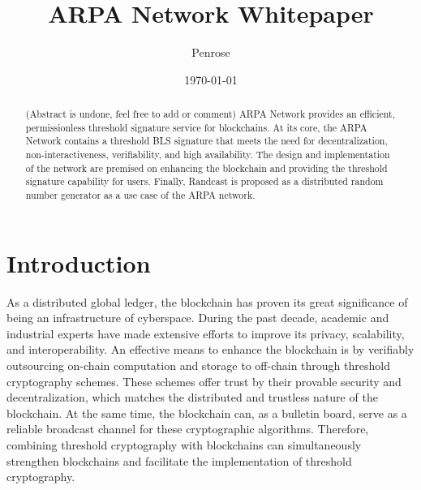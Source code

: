 \documentclass[11pt]{article}
\title{ARPA Network Whitepaper}
\author{Penrose}
\date{\today}
\begin{document}
\maketitle

\begin{abstract}
(Abstract is undone, feel free to add or comment) ARPA Network provides an efficient, permissionless threshold signature service for blockchains. At its core, the ARPA Network contains a threshold BLS signature that meets the need for decentralization, non-interactiveness, verifiability, and high availability. The design and implementation of the network are premised on enhancing the blockchain and providing the threshold signature capability for users. Finally, Randcast is proposed as a distributed random number generator as a use case of the ARPA network. 

\end{abstract}

\section{Introduction}
As a distributed global ledger, the blockchain has proven its great significance of being an infrastructure of cyberspace. During the past decade, academic and industrial experts have made extensive efforts to improve its privacy, scalability, and interoperability. An effective means to enhance the blockchain is by verifiably outsourcing on-chain computation and storage to off-chain through threshold cryptography schemes. These schemes offer trust by their provable security and decentralization, which matches the distributed and trustless nature of the blockchain. At the same time, the blockchain can, as a bulletin board, serve as a reliable broadcast channel for these cryptographic algorithms. Therefore, combining threshold cryptography with blockchains can simultaneously strengthen blockchains and facilitate the implementation of threshold cryptography.
\end{document}
